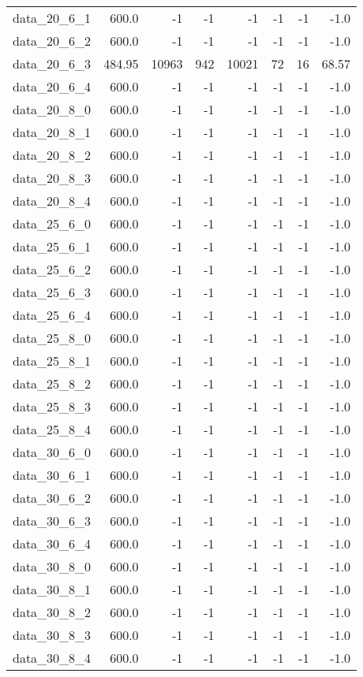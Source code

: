 \begin{tabular}{rrrrrrrr}
  data\_20\_6\_1 & 600.0 & -1 & -1 & -1 & -1 & -1 & -1.0 \\
  data\_20\_6\_2 & 600.0 & -1 & -1 & -1 & -1 & -1 & -1.0 \\
  data\_20\_6\_3 & 484.95 & 10963 & 942 & 10021 & 72 & 16 & 68.57 \\
  data\_20\_6\_4 & 600.0 & -1 & -1 & -1 & -1 & -1 & -1.0 \\
  data\_20\_8\_0 & 600.0 & -1 & -1 & -1 & -1 & -1 & -1.0 \\
  data\_20\_8\_1 & 600.0 & -1 & -1 & -1 & -1 & -1 & -1.0 \\
  data\_20\_8\_2 & 600.0 & -1 & -1 & -1 & -1 & -1 & -1.0 \\
  data\_20\_8\_3 & 600.0 & -1 & -1 & -1 & -1 & -1 & -1.0 \\
  data\_20\_8\_4 & 600.0 & -1 & -1 & -1 & -1 & -1 & -1.0 \\
  data\_25\_6\_0 & 600.0 & -1 & -1 & -1 & -1 & -1 & -1.0 \\
  data\_25\_6\_1 & 600.0 & -1 & -1 & -1 & -1 & -1 & -1.0 \\
  data\_25\_6\_2 & 600.0 & -1 & -1 & -1 & -1 & -1 & -1.0 \\
  data\_25\_6\_3 & 600.0 & -1 & -1 & -1 & -1 & -1 & -1.0 \\
  data\_25\_6\_4 & 600.0 & -1 & -1 & -1 & -1 & -1 & -1.0 \\
  data\_25\_8\_0 & 600.0 & -1 & -1 & -1 & -1 & -1 & -1.0 \\
  data\_25\_8\_1 & 600.0 & -1 & -1 & -1 & -1 & -1 & -1.0 \\
  data\_25\_8\_2 & 600.0 & -1 & -1 & -1 & -1 & -1 & -1.0 \\
  data\_25\_8\_3 & 600.0 & -1 & -1 & -1 & -1 & -1 & -1.0 \\
  data\_25\_8\_4 & 600.0 & -1 & -1 & -1 & -1 & -1 & -1.0 \\
  data\_30\_6\_0 & 600.0 & -1 & -1 & -1 & -1 & -1 & -1.0 \\
  data\_30\_6\_1 & 600.0 & -1 & -1 & -1 & -1 & -1 & -1.0 \\
  data\_30\_6\_2 & 600.0 & -1 & -1 & -1 & -1 & -1 & -1.0 \\
  data\_30\_6\_3 & 600.0 & -1 & -1 & -1 & -1 & -1 & -1.0 \\
  data\_30\_6\_4 & 600.0 & -1 & -1 & -1 & -1 & -1 & -1.0 \\
  data\_30\_8\_0 & 600.0 & -1 & -1 & -1 & -1 & -1 & -1.0 \\
  data\_30\_8\_1 & 600.0 & -1 & -1 & -1 & -1 & -1 & -1.0 \\
  data\_30\_8\_2 & 600.0 & -1 & -1 & -1 & -1 & -1 & -1.0 \\
  data\_30\_8\_3 & 600.0 & -1 & -1 & -1 & -1 & -1 & -1.0 \\
  data\_30\_8\_4 & 600.0 & -1 & -1 & -1 & -1 & -1 & -1.0 \\\hline
\end{tabular}

